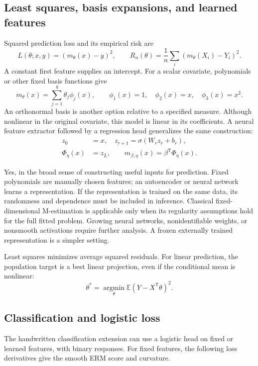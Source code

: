 \documentclass[12pt]{article}
\newcommand{\E}{\mathbb E}
\begin{document}
\subsection{Least squares, basis expansions, and learned features}
Squared prediction loss and its empirical risk are
\begin{equation}
 L(\theta;x,y)=(m_\theta(x)-y)^2,\qquad
 R_n(\theta)=\frac1n\sum_i(m_\theta(X_i)-Y_i)^2.
\end{equation}
A constant first feature supplies an intercept. For a scalar covariate,
polynomials or other fixed basis functions give
\begin{equation}
 m_\theta(x)=\sum_{j=1}^q\theta_j\phi_j(x),\qquad
 \phi_1(x)=1,\quad\phi_2(x)=x,\quad\phi_3(x)=x^2.
\end{equation}
An orthonormal basis is another option relative to a specified measure.
Although nonlinear in the original covariate, this model is linear in
its coefficients. A neural feature extractor followed by a regression
head generalizes the same construction:
\begin{align}
 z_0&=x,\quad z_{r+1}=\sigma(W_rz_r+b_r),\\
 \Phi_\eta(x)&=z_L,\qquad m_{\beta,\eta}(x)=\beta^{\mathsf T}\Phi_\eta(x).
\end{align}
\begin{remarkbox}
Yes, in the broad sense of constructing useful inputs for prediction.
Fixed polynomials are manually chosen features; an autoencoder or neural
network learns a representation. If the representation is trained on the
same data, its randomness and dependence must be included in inference.
Classical fixed-dimensional M-estimation is applicable only when its
regularity assumptions hold for the full fitted problem. Growing neural
networks, nonidentifiable weights, or nonsmooth activations require further
analysis. A frozen externally trained representation is a simpler setting.
\end{remarkbox}
Least squares minimizes average squared residuals. For linear prediction,
the population target is a best linear projection, even if the conditional
mean is nonlinear:
\begin{equation}
 \theta^*=\operatorname*{argmin}_\theta\E(Y-X^{\mathsf T}\theta)^2.
\end{equation}
\subsection{Classification and logistic loss}
The handwritten classification extension can use a logistic head on fixed
or learned features, with binary responses. For fixed features, the
following loss derivatives give the smooth ERM score and curvature.
\end{document}
